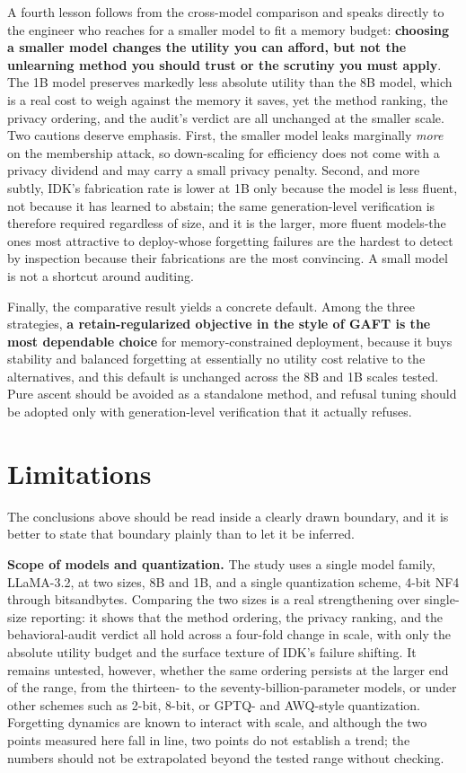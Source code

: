 \documentclass[a4paper,12pt]{report}
\begin{document}
A fourth lesson follows from the cross-model comparison and speaks directly to the engineer who reaches for a smaller model to fit a memory budget: \textbf{choosing a smaller model changes the utility you can afford, but not the unlearning method you should trust or the scrutiny you must apply}. The 1B model preserves markedly less absolute utility than the 8B model, which is a real cost to weigh against the memory it saves, yet the method ranking, the privacy ordering, and the audit's verdict are all unchanged at the smaller scale. Two cautions deserve emphasis. First, the smaller model leaks marginally \emph{more} on the membership attack, so down-scaling for efficiency does not come with a privacy dividend and may carry a small privacy penalty. Second, and more subtly, IDK's fabrication rate is lower at 1B only because the model is less fluent, not because it has learned to abstain; the same generation-level verification is therefore required regardless of size, and it is the larger, more fluent models-the ones most attractive to deploy-whose forgetting failures are the hardest to detect by inspection because their fabrications are the most convincing. A small model is not a shortcut around auditing.

Finally, the comparative result yields a concrete default. Among the three strategies, \textbf{a retain-regularized objective in the style of GAFT is the most dependable choice} for memory-constrained deployment, because it buys stability and balanced forgetting at essentially no utility cost relative to the alternatives, and this default is unchanged across the 8B and 1B scales tested. Pure ascent should be avoided as a standalone method, and refusal tuning should be adopted only with generation-level verification that it actually refuses.

\section{Limitations}
\label{sec:disc-limitations}
The conclusions above should be read inside a clearly drawn boundary, and it is better to state that boundary plainly than to let it be inferred.

\textbf{Scope of models and quantization.} The study uses a single model family, LLaMA-3.2, at two sizes, 8B and 1B, and a single quantization scheme, 4-bit NF4 through bitsandbytes. Comparing the two sizes is a real strengthening over single-size reporting: it shows that the method ordering, the privacy ranking, and the behavioral-audit verdict all hold across a four-fold change in scale, with only the absolute utility budget and the surface texture of IDK's failure shifting. It remains untested, however, whether the same ordering persists at the larger end of the range, from the thirteen- to the seventy-billion-parameter models, or under other schemes such as 2-bit, 8-bit, or GPTQ- and AWQ-style quantization. Forgetting dynamics are known to interact with scale, and although the two points measured here fall in line, two points do not establish a trend; the numbers should not be extrapolated beyond the tested range without checking.
\end{document}

